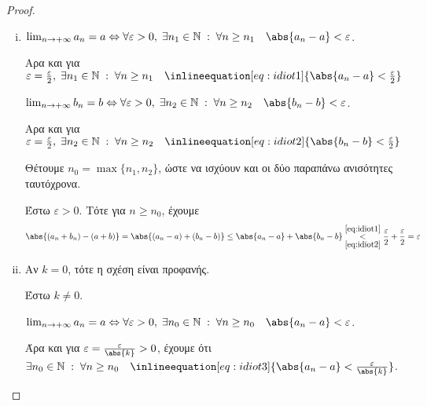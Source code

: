 \documentclass[main.tex]{subfiles}
\begin{document}
\begin{proof}
\item {}
    \begin{enumerate}[i)]
        \item $ \lim_{n \to +\infty} a_{n} = a \Leftrightarrow \forall 
            \varepsilon > 0, \; \exists n_{1} \in \mathbb{N} \; : \; 
            \forall n \geq n_{1} \quad \abs{a_{n}-a} < \varepsilon$.

            Αρα και για $ \varepsilon = \frac{\varepsilon}{ 2}, \; 
            \exists n_{1} \in \mathbb{N} \; : \; \forall n \geq n_{1} 
            \quad \inlineequation[eq:idiot1]{\abs{a_{n}-a} <
            \frac{\varepsilon}{2}} $

            $ \lim_{n \to +\infty} b_{n} = b \Leftrightarrow \forall 
            \varepsilon > 0, \; \exists n_{2} \in \mathbb{N} \; : \; 
            \forall n \geq n_{2} \quad \abs{b_{n}-b} < \varepsilon$.

            Αρα και για $ \varepsilon = \frac{\varepsilon}{ 2}, \; 
            \exists n_{2} \in \mathbb{N} \; : \; \forall n \geq n_{2} 
            \quad \inlineequation[eq:idiot2]{\abs{b_{n}-b} <
            \frac{\varepsilon}{2}} $

            Θέτουμε $ n_{0}= \max \{ n_{1}, n_{2} \} $, ώστε να ισχύουν 
            και οι δύο παραπάνω ανισότητες ταυτόχρονα.

            Έστω $ \varepsilon >0 $. Τότε για $ n \geq n_{0} $, έχουμε 
            \[
                \abs{(a_{n}+ b_{n}) - (a+b)} = \abs{(a_{n}- a) + 
                (b_{n}-b)} \leq \abs{a_{n}- a} + \abs{b_{n}-b} 
                \overset{\eqref{eq:idiot1}}
                {\underset{\eqref{eq:idiot2}}{<}} 
                \frac{\varepsilon }{2} + \frac{\varepsilon}{ 2} = 
                \varepsilon
            \] 

        \item 
            Αν $ k=0 $, τότε η σχέση είναι προφανής.

            Έστω $ k \neq 0 $. 

            $ \lim_{n \to +\infty} a_{n} = a \Leftrightarrow \forall 
            \varepsilon >0, \; \exists 
            n_{0} \in \mathbb{N} \; : \; \forall n \geq n_{0} \quad 
            \abs{a_{n}- a} < \varepsilon$. 

            Άρα και για $ \varepsilon = \frac{\varepsilon}{\abs{k}} >0$,
            έχουμε ότι $ \exists n_{0} \in \mathbb{N} \; : \; 
            \forall n \geq n_{0} \quad \inlineequation[eq:idiot3]
            {\abs{a_{n}- a} < \frac{\varepsilon}{\abs{k}}}$. 


\end{enumerate}
\end{proof}
\end{document}
